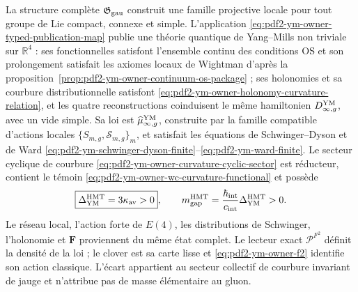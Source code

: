 \begin{theorem}
\label{thm:pdf2-ym-cierre-global}
La structure complète $\mathfrak G_{\rm gau}$ construit une famille projective locale pour tout groupe de Lie compact, connexe et simple. L'application \eqref{eq:pdf2-ym-owner-typed-publication-map} publie une théorie quantique de Yang--Mills non triviale sur $\mathbb R^4$ : ses fonctionnelles satisfont l'ensemble continu des conditions OS et son prolongement satisfait les axiomes locaux de Wightman d'après la proposition~\ref{prop:pdf2-ym-owner-continuum-os-package} ; ses holonomies et sa courbure distributionnelle satisfont \eqref{eq:pdf2-ym-owner-holonomy-curvature-relation}, et les quatre reconstructions coinduisent le même hamiltonien $D_{\infty,g}^{\rm YM}$, avec un vide simple. Sa loi est $\widehat\mu_{\infty,g}^{\rm YM}$, construite par la famille compatible d'actions locales $\{S_{m,g},\mathscr S_{m,g}\}_m$, et satisfait les équations de Schwinger--Dyson et de Ward \eqref{eq:pdf2-ym-schwinger-dyson-finite}--\eqref{eq:pdf2-ym-ward-finite}. Le secteur cyclique de courbure \eqref{eq:pdf2-ym-owner-curvature-cyclic-sector} est réducteur, contient le témoin \eqref{eq:pdf2-ym-owner-wc-curvature-functional} et possède
\begin{equation}\label{eq:pdf2-ym-final-gap}
 \boxed{\Delta_{\rm YM}^{\rm HMT}=3\kappa_{\rm av}>0},
 \qquad
 m_{\rm gap}^{\rm HMT}
 =\frac{\hbar_{\rm int}}{c_{\rm int}}\Delta_{\rm YM}^{\rm HMT}>0.
\end{equation}
Le réseau local, l’action forte de $E(4)$, les distributions de Schwinger,
l’holonomie et $\mathbf F$ proviennent du même état complet. Le lecteur exact
$\mathcal P^{F^2}$ définit la densité de la loi ; le clover est sa carte lisse et
\eqref{eq:pdf2-ym-owner-f2} identifie son action classique. L’écart appartient au secteur collectif
de courbure invariant de jauge et n’attribue pas de masse élémentaire au gluon.
\end{theorem}

